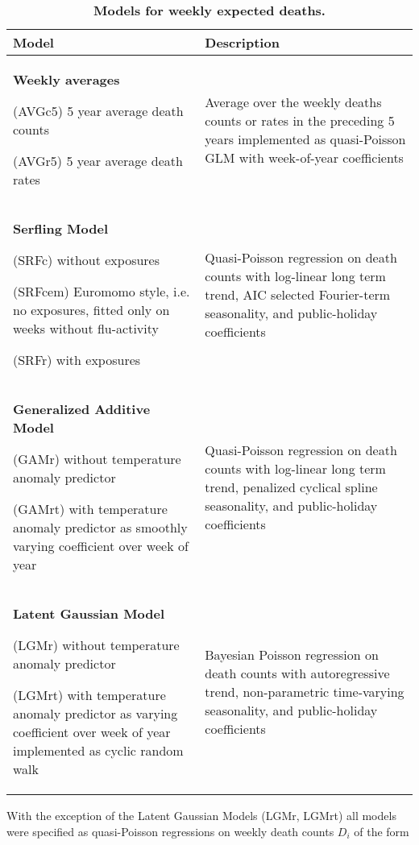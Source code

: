 \documentclass[10pt,letterpaper]{article}
\begin{document}
\begin{table}[!ht]
  \centering
  \caption{\bf Models for weekly expected deaths.}
  \label{tab:models}
  \begin{tabularx}{\textwidth} {
    >{\raggedright\arraybackslash}X
    >{\raggedright\arraybackslash}X
  }
  \toprule
  \textbf{Model} & \textbf{Description} \\ \midrule
  \textbf{Weekly averages}\par
  (AVGc5) 5 year average death counts\par
  (AVGr5) 5 year average death rates
   &
   Average over the weekly deaths counts or rates in the preceding 5 years implemented as quasi-Poisson GLM with week-of-year coefficients
  \\ \midrule
  \textbf{Serfling Model}\par
  (SRFc) without exposures\par
  (SRFcem) Euromomo style, i.e. no exposures, fitted only on weeks without flu-activity\par
  (SRFr) with exposures
  &
  Quasi-Poisson regression on death counts with log-linear long term trend, AIC selected Fourier-term seasonality, and public-holiday coefficients
  \\ \midrule
  \textbf{Generalized Additive Model}\par
  (GAMr) without temperature anomaly predictor\par
  (GAMrt) with temperature anomaly predictor as smoothly varying coefficient over week of year
  &
  Quasi-Poisson regression on death counts with log-linear long term trend, penalized cyclical spline seasonality, and public-holiday coefficients
  \\ \midrule
  \textbf{Latent Gaussian Model}\par
  (LGMr) without temperature anomaly predictor\par
  (LGMrt) with temperature anomaly predictor as varying coefficient over week of year implemented as cyclic random walk\par
  &
  Bayesian Poisson regression on death counts with autoregressive trend, non-parametric time-varying seasonality, and public-holiday coefficients
  \\ \bottomrule
  \end{tabularx}
\end{table}

With the exception of the Latent Gaussian Models (LGMr, LGMrt) all models were specified as quasi-Poisson regressions on weekly death counts $D_i$ of the form
\end{document}
